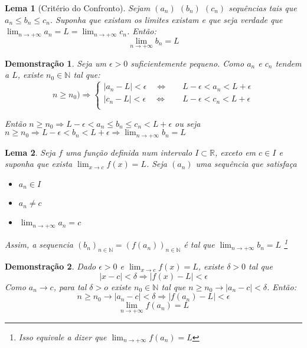 \documentclass[12pt,openany]{book}
\newtheorem{lemma}{Lema}[section]
\newtheorem{demonstration}{Demonstração}
\begin{document}
\begin{lemma}[Critério do Confronto]
Sejam $(a_n)$ $(b_n)$ $(c_n)$ sequências tais que $a_n \leq b_n \leq c_n$. Suponha que existam os limites existam e que seja verdade que $\displaystyle{\lim_{n \rightarrow + \infty} a_n = L = \lim_{n \rightarrow + \infty} c_n}$. Então: $$\lim_{n \rightarrow + \infty} b_n = L$$
\end{lemma}

\begin{demonstration}
Seja um $\epsilon > 0$ suficientemente pequeno. Como $a_n$ e  $c_n$ tendem a $L$, existe $n_0 \in \mathds{N}$ tal que:
\[ n \geq n_0) \Rightarrow
  \begin{cases}
    |a_n - L| < \epsilon \quad \Longleftrightarrow  & \quad L - \epsilon < a_n < L +\epsilon \\
    |c_n - L| < \epsilon \quad \Longleftrightarrow  & \quad L - \epsilon < c_n < L +\epsilon \\
  \end{cases}
\]

Então $n \geq n_0 \Rightarrow L - \epsilon < a_n \leq b_n \leq c_n < L + \epsilon$ ou seja $n \geq n_0 \Rightarrow L- \epsilon < b_n < L + \epsilon \Rightarrow \displaystyle{\lim_{n \rightarrow + \infty} b_n = L}$
\end{demonstration}

\begin{lemma}
Seja $f$ uma função definida num intervalo $I \subset \mathds{R}$, exceto em $c \in I$ e suponha que exista $\displaystyle{\lim_{x \rightarrow c} f(x) = L}$. Seja $(a_n)$ uma sequência que satisfaça \begin{itemize}
\item [a.] $a_n \in I$
\item [b.] $a_n \neq c $
\item [c.] $\displaystyle{\lim_{n \rightarrow + \infty} a_n = c} $
\end{itemize}
Assim, a sequencia $(b_n)_{n \in \mathds{N}} =(f(a_n))_{n \in \mathds{N}}$ é tal que $\displaystyle{\lim_{n \rightarrow + \infty} b_n = L}$ \footnote{Isso equivale a dizer que $\displaystyle{\lim_{n \rightarrow + \infty} f(a_n) = L} $}
\end{lemma}

\begin{demonstration}Dado $\epsilon > 0$ e $\displaystyle{\lim_{x \rightarrow c} f(x) = L}$, existe $\delta > 0$ tal que $$ |x-c| < \delta \Rightarrow |f(x) - L| < \epsilon $$ \hspace{5mm} Como $a_n \rightarrow c$, para tal $\delta > o$ existe $n_0 \in \mathds{N}$ tal que $n \geq n_0 \rightarrow |a_n - c| < \delta$. Então: $$n \geq n_0 \rightarrow |a_n - c| < \delta \Rightarrow |f(a_n) - L| < \epsilon$$ $$ \lim_{n \rightarrow +\infty} f(a_n) = L$$
\end{demonstration}
\end{document}
